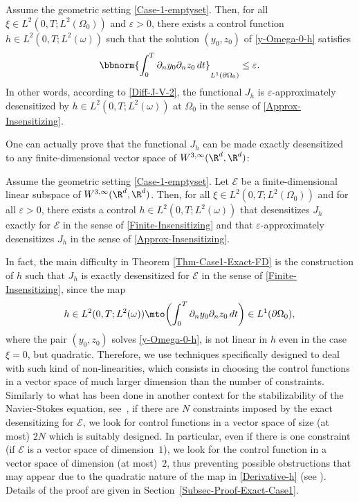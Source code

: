 \begin{theorem}
\label{Thm-Approx-Case1}
Assume the geometric setting \eqref{Case-1-emptyset}. Then, for all $\xi \!\in\! L^2(0,T; L^2(\Omega_0))$ and $\varepsilon >0$, there exists a control function $h \in L^2(0,T; L^2(\omega))$ such that the solution $(y_0,z_0)$ of \eqref{y-Omega-0-h} satisfies
\begin{equation}
\label{Approx-Insensitzing-Equivalent}
\bbnorm{ \int_0^T \partial_n y_0 \partial_n z_0 \, dt}_{L^1(\partial \Omega_0)} \leq \varepsilon.
\end{equation}
In other words, according to \eqref{Diff-J-V-2}, the functional $J_h$ is $\varepsilon$-approximately desensitized by $h \in L^2(0,T; L^2(\omega))$ at $\Omega_0$ in the sense of \eqref{Approx-Insensitizing}.
\end{theorem}

One can actually prove that the functional $J_h$ can be made exactly desensitized to any finite-dimensional vector space of $W^{3, \infty}(\R^d, \R^d)$:

\begin{theorem}
\label{Thm-Case1-Exact-FD}
Assume the geometric setting \eqref{Case-1-emptyset}. Let $\mathcal{E}$ be a finite-dimensional linear subspace of $W^{3, \infty}(\R^d, \R^d)$. Then, for all $\xi \in L^2(0,T; L^2(\Omega_0))$ and for all $\varepsilon>0$, there exists a control $h\in L^2(0,T; L^2(\omega))$ that desensitizes $J_h$ exactly for $\mathcal{E}$ in the sense of \eqref{Finite-Insensitizing} and that $\varepsilon$-approximately desensitizes $J_h$ in the sense of \eqref{Approx-Insensitizing}.
\end{theorem}

In fact, the main difficulty in Theorem \ref{Thm-Case1-Exact-FD} is the construction of $h$ such that $J_h$ is exactly desensitized for $\mathcal{E}$ in the sense of \eqref{Finite-Insensitizing}, since the map
\begin{equation}
\label{Derivative-h}
h \in L^2(0,T; L^2(\omega)) \mto \biggl(\int_0^T \partial_n y_0 \partial_n z_0 \, dt\biggr) \in L^1(\partial \Omega_0),
\end{equation}
where the pair $(y_0,z_0)$ solves \eqref{y-Omega-0-h}, is not linear in $h$ even in the case $\xi = 0$, but quadratic. Therefore, we use techniques specifically designed to deal with such kind of non-linearities, which consists in choosing the control functions in a vector space of much larger dimension than the number of constraints. Similarly to what has been done in another context for the stabilizability of the Navier-Stokes equation, see~\cite{Chowdhury-Erv-2019}, if there are $N$ constraints imposed by the exact desensitizing for $\mathcal E$, we look for control functions in a vector space of size (at most) $2N$ which is suitably designed. In particular, even if there is one constraint (\ie if $\mathcal{E}$ is a vector space of dimen\-sion~$1$), we look for the control function in a vector space of dimension (at most)~$2$, thus preventing possible obstructions that may appear due to the quadratic nature of the map in \eqref{Derivative-h} (see \eg \cite{Beauchard-Marbach-2017}).
Details of the proof are given in Section~\ref{Subsec-Proof-Exact-Case1}.

